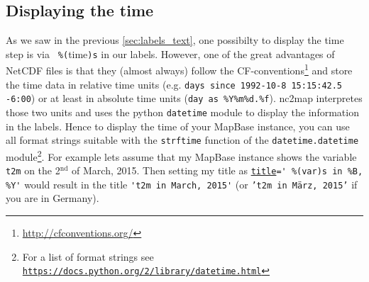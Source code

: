 \subsection{Displaying the time} \label{sec:labels_time}
As we saw in the previous \autoref{sec:labels_text}, one possibilty to display the time step is via \lstinline| %(|\gls{time}\lstinline|)s| in our labels. However, one of the great advantages of NetCDF files is that they (almost always) follow the CF-conventions\footnote{\url{http://cfconventions.org/}} and store the time data in relative time units (e.g. \lstinline|days since 1992-10-8 15:15:42.5 -6:00|) or at least in absolute time units (\lstinline|day as %Y%m%d.%f|). \gls{nc2map} interpretes those two units and uses the python \lstinline|datetime| module to display the information in the labels. Hence to display the time of your \gls{MapBase} instance, you can use all format strings suitable with the \lstinline|strftime| function of the \lstinline|datetime.datetime| module\footnote{For a list of format strings see \href{https://docs.python.org/2/library/datetime.html\#strftime-and-strptime-behavior}{\nolinkurl{https://docs.python.org/2/library/datetime.html}}}. For example lets assume that my \gls{MapBase} instance shows the variable \lstinline|t2m| on the 2$^\text{nd}$ of March, 2015. Then setting my title as \hyperref[item:title]{\lstinline|title|}\lstinline|=' %(var)s in %B, %Y'| would result in the title \lstinline|'t2m in March, 2015'| (or {\footnotesize \texttt{'t2m in M\"arz, 2015'}} if you are in Germany).
